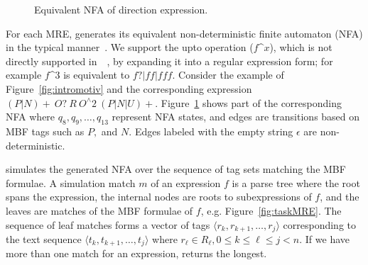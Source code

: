 \setarab
\transfalse
\begin{figure}[tb]
\centering
{}
\vspace{-1em}
  \caption{\label{fig:nfaEx}Equivalent NFA of direction expression.}
  \vspace{-1em}
\end{figure}
\transtrue
{}

For each MRE, 
\framework generates its equivalent non-deterministic finite automaton (NFA) in the typical manner~\cite{sipser2012introduction}.
We support the upto operation ($f$\^{}$x$), which is not directly 
supported in~~\citeyear{sipser2012introduction}, by 
expanding it into a regular expression form; for example 
$f$\^{}$3$ is equivalent to $f?|ff|fff$. 
Consider the example of Figure~\ref{fig:intromotiv} and the
corresponding expression $(P|N)\!+~O?~R~O^\wedge 2~(P|N|U)+$.
Figure~\ref{fig:nfaEx} shows part of the corresponding NFA where
$q_8, q_9, \dots, q_{13}$ represent NFA states,
and edges are transitions based on MBF tags such as 
$P,$ and $N$.
Edges labeled with the empty string $\epsilon$ are non-deterministic.

\framework simulates the generated NFA over the sequence of tag sets matching the MBF formulae.
A simulation match $m$ of an expression $f$ is a parse tree where the root spans the expression, the internal nodes are roots to subexpressions of $f$, and the leaves are matches of the MBF formulae of $f$, e.g. Figure~\ref{fig:taskMRE}.
The sequence of leaf matches forms a vector of tags $\langle r_k,r_{k+1},\dots,r_j\rangle$ 
corresponding to the text sequence 
$\langle t_k,t_{k+1},\dots,t_j\rangle$ where $r_{\ell}\in R_{\ell},0\le k\le \ell \le j < n$.
%
%
If we have more than one match for an expression, 
\framework returns the longest.

